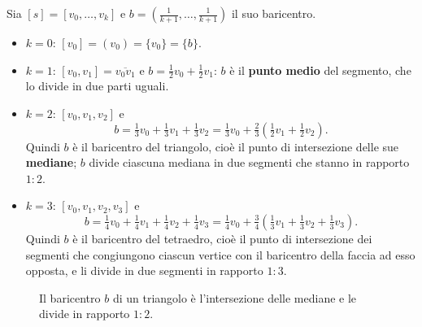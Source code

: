 \begin{ejemplo}
Sia $[s] = [v_0, \dots, v_k]$ e $b = \left( \frac{1}{k+1}, \dots, \frac{1}{k+1} \right)$ il suo baricentro.
\begin{itemize}
    \item $k = 0$: $[v_0] = (v_0) = \{v_0\} = \{b\}$.
    \item $k = 1$: $[v_0, v_1] = \overline{v_0 v_1}$ e $b = \frac12 v_0 + \frac12 v_1$: $b$ \`e il \textbf{punto medio} del segmento, che lo divide in due parti uguali.
    \item $k = 2$: $[v_0, v_1, v_2]$ e
    \[
    b = \tfrac13 v_0 + \tfrac13 v_1 + \tfrac13 v_2 = \tfrac13 v_0 + \tfrac23\left( \tfrac12 v_1 + \tfrac12 v_2 \right) .
    \]
    Quindi $b$ \`e il baricentro del triangolo, cio\`e il punto di intersezione delle sue \textbf{mediane}; $b$ divide ciascuna mediana in due segmenti che stanno in rapporto $1 : 2$.
    \item $k = 3$: $[v_0, v_1, v_2, v_3]$ e
    \[
    b = \tfrac14 v_0 + \tfrac14 v_1 + \tfrac14 v_2 + \tfrac14 v_3 = \tfrac14 v_0 + \tfrac34\left( \tfrac13 v_1 + \tfrac13 v_2 + \tfrac13 v_3 \right).
    \]
    Quindi $b$ \`e il baricentro del tetraedro, cio\`e il punto di intersezione dei segmenti che congiungono ciascun vertice con il baricentro della faccia ad esso opposta, e li divide in due segmenti in rapporto $1 : 3$.
\end{itemize}
\end{ejemplo}

\begin{figure}[H]
    \centering
    \caption{Il baricentro $b$ di un triangolo \`e l'intersezione delle mediane e le divide in rapporto $1:2$.}
\end{figure}

